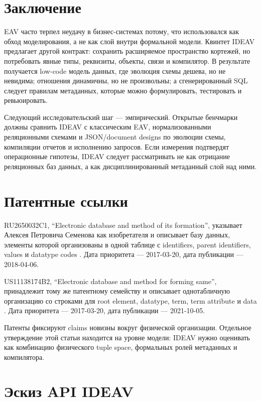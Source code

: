 \documentclass[11pt]{article}
\begin{document}
\section{Заключение}

EAV часто терпел неудачу в бизнес-системах потому, что использовался как обход
моделирования, а не как слой внутри формальной модели. Квинтет IDEAV предлагает
другой контракт: сохранить расширяемое пространство кортежей, но потребовать
явные типы, реквизиты, объекты, связи и компилятор. В результате получается
low-code модель данных, где эволюция схемы дешева, но не невидима; отношения
динамичны, но не произвольны; а сгенерированный SQL следует правилам
метаданных, которые можно формулировать, тестировать и ревьюировать.

Следующий исследовательский шаг --- эмпирический. Открытые бенчмарки должны
сравнить IDEAV с классическим EAV, нормализованными реляционными схемами и
JSON/document designs по эволюции схемы, компиляции отчетов и исполнению
запросов. Если измерения подтвердят операционные гипотезы, IDEAV следует
рассматривать не как отрицание реляционных баз данных, а как дисциплинированный
метаданный слой над ними.

\appendix

\section{Патентные ссылки}

RU2650032C1, ``Electronic database and method of its formation'', указывает
Алексея Петровича Семенова как изобретателя и описывает базу данных, элементы
которой организованы в одной таблице с identifiers, parent identifiers, values
и datatype codes \citep{semenov2018ru}. Дата приоритета --- 2017-03-20, дата
публикации --- 2018-04-06.

US11138174B2, ``Electronic database and method for forming same'', принадлежит
тому же патентному семейству и описывает однотабличную организацию со строками
для root element, datatype, term, term attribute и data \citep{semenov2021us}.
Дата приоритета --- 2017-03-20, дата публикации --- 2021-10-05.

Патенты фиксируют claims новизны вокруг физической организации. Отдельное
утверждение этой статьи находится на уровне модели: IDEAV нужно оценивать как
комбинацию физического tuple space, формальных ролей метаданных и компилятора.

\section{Эскиз API IDEAV}
\end{document}
